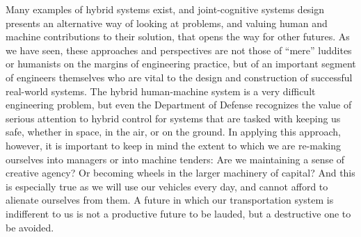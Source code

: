 Many examples of hybrid systems exist, and joint-cognitive systems
design presents an alternative way of looking at problems, and valuing
human and machine contributions to their solution, that opens the way
for other futures. As we have seen, these approaches and
perspectives are not those of ``mere'' luddites or humanists on the
margins of engineering practice, but of an important segment of
engineers themselves who are vital to the design and construction of
successful real-world systems. The hybrid human-machine system is a
very difficult engineering problem, but even the Department of Defense
recognizes the value of serious attention to hybrid control for 
systems that are tasked with keeping us safe, whether in space, in the
air, or on the ground. In applying this approach, however, it is
important to keep in mind the extent to which we are re-making
ourselves into managers or into machine tenders:  Are we maintaining a sense of
creative agency? Or becoming wheels in the larger machinery of capital? And
this is especially true as we will use our 
vehicles every day, and cannot afford to alienate ourselves from them.
A future in which our transportation system is indifferent to us is
not a productive future to be lauded, but a destructive one to be
avoided. 


